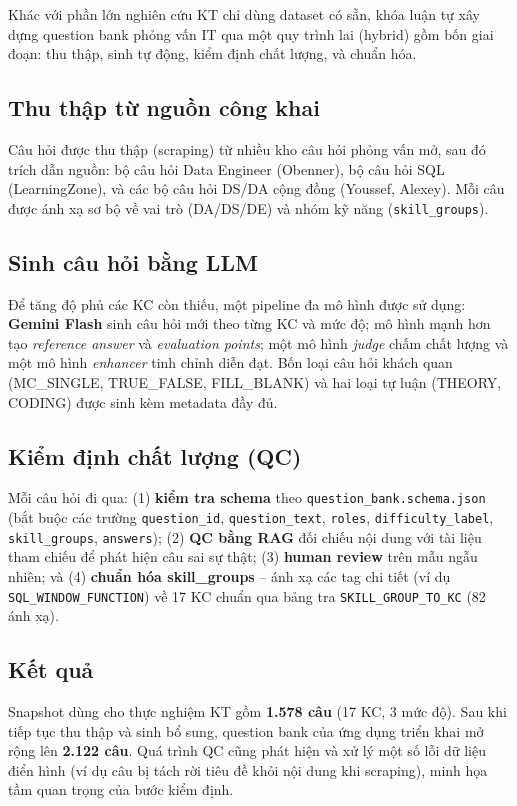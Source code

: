 \documentclass[12pt, a4paper]{report}
\begin{document}
Khác với phần lớn nghiên cứu KT chỉ dùng dataset có sẵn, khóa luận tự xây dựng question bank phỏng vấn IT qua một quy trình lai (hybrid) gồm bốn giai đoạn: thu thập, sinh tự động, kiểm định chất lượng, và chuẩn hóa.

\subsection{Thu thập từ nguồn công khai}
Câu hỏi được thu thập (scraping) từ nhiều kho câu hỏi phỏng vấn mở, sau đó trích dẫn nguồn: bộ câu hỏi Data Engineer (Obenner), bộ câu hỏi SQL (LearningZone), và các bộ câu hỏi DS/DA cộng đồng (Youssef, Alexey). Mỗi câu được ánh xạ sơ bộ về vai trò (DA/DS/DE) và nhóm kỹ năng (\texttt{skill\_groups}).

\subsection{Sinh câu hỏi bằng LLM}
Để tăng độ phủ các KC còn thiếu, một pipeline đa mô hình được sử dụng: \textbf{Gemini Flash} sinh câu hỏi mới theo từng KC và mức độ; mô hình mạnh hơn tạo \textit{reference answer} và \textit{evaluation points}; một mô hình \textit{judge} chấm chất lượng và một mô hình \textit{enhancer} tinh chỉnh diễn đạt. Bốn loại câu hỏi khách quan (MC\_SINGLE, TRUE\_FALSE, FILL\_BLANK) và hai loại tự luận (THEORY, CODING) được sinh kèm metadata đầy đủ.

\subsection{Kiểm định chất lượng (QC)}
Mỗi câu hỏi đi qua: (1) \textbf{kiểm tra schema} theo \texttt{question\_bank.schema.json} (bắt buộc các trường \texttt{question\_id}, \texttt{question\_text}, \texttt{roles}, \texttt{difficulty\_label}, \texttt{skill\_groups}, \texttt{answers}); (2) \textbf{QC bằng RAG} đối chiếu nội dung với tài liệu tham chiếu để phát hiện câu sai sự thật; (3) \textbf{human review} trên mẫu ngẫu nhiên; và (4) \textbf{chuẩn hóa skill\_groups} -- ánh xạ các tag chi tiết (ví dụ \texttt{SQL\_WINDOW\_FUNCTION}) về 17 KC chuẩn qua bảng tra \texttt{SKILL\_GROUP\_TO\_KC} (82 ánh xạ).

\subsection{Kết quả}
Snapshot dùng cho thực nghiệm KT gồm \textbf{1.578 câu} (17 KC, 3 mức độ). Sau khi tiếp tục thu thập và sinh bổ sung, question bank của ứng dụng triển khai mở rộng lên \textbf{2.122 câu}. Quá trình QC cũng phát hiện và xử lý một số lỗi dữ liệu điển hình (ví dụ câu bị tách rời tiêu đề khỏi nội dung khi scraping), minh họa tầm quan trọng của bước kiểm định.
\end{document}
